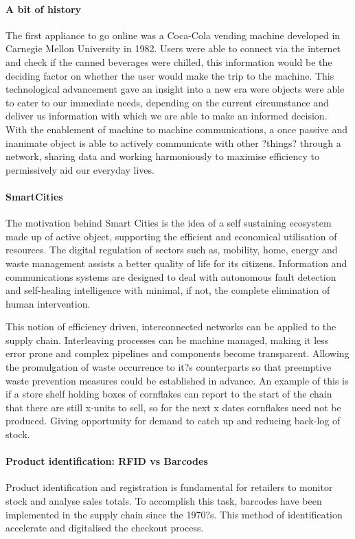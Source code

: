 \documentclass[a4paper, 11pt]{article}
\begin{document}
\paragraph{A bit of history} The first appliance to go online was a Coca-Cola vending machine developed in Carnegie Mellon University in 1982. Users were able to connect via the internet and check if the canned beverages were chilled, this information would be the deciding factor on whether the user would make the trip to the machine. This technological advancement gave an insight into a new era were objects were able to cater to our immediate needs, depending on the current circumstance and deliver us information with which we are able to make an informed decision. With the enablement of machine to machine communications, a once passive and inanimate object is able to actively communicate with other ?things? through a network, sharing data and working harmoniously to maximise efficiency to permissively aid our everyday lives.

\paragraph{SmartCities} The motivation behind Smart Cities is the idea of a self sustaining ecosystem made up of active object, supporting the efficient and economical utilisation of resources. The digital regulation of sectors such as, mobility, home, energy and waste management assists a better quality of life for its citizens. Information and communications systems are designed to deal with autonomous fault detection and self-healing intelligence with minimal, if not, the complete elimination of human intervention. 

This notion of efficiency driven, interconnected networks can be applied to the supply chain. Interleaving processes can be machine managed, making it less error prone and complex pipelines and components become transparent. Allowing the promulgation of waste occurrence to it?s counterparts so that preemptive waste prevention measures could be established in advance. An example of this is if a store shelf holding boxes of cornflakes can report to the start of the chain that there are still x-units to sell, so for the next x dates cornflakes need not be produced. Giving opportunity for demand to catch up and reducing back-log of stock.

\paragraph{Product identification: RFID vs Barcodes}Product identification and registration is fundamental for retailers to monitor stock and analyse sales totals. To accomplish this task, barcodes have been implemented in the supply chain since the 1970?s. This method of identification accelerate and digitalised the checkout process. 
\end{document}
